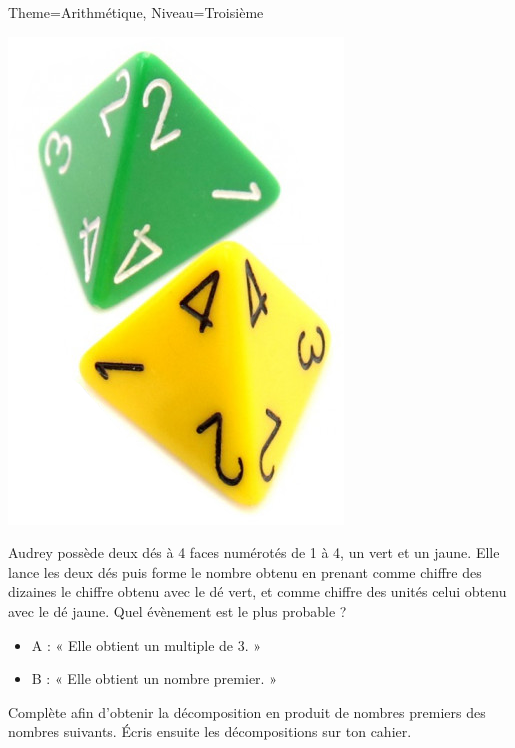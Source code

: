 \documentclass[11pt]{article}
\begin{document}
\begin{multicols}{2}
\begin{Maquette}[Fiche]{Theme=Arithmétique, Niveau=Troisième}
\begin{exercice}
    \begin{center}
        \includegraphics[width=.5\linewidth]{Images/Dés4faces.png}
    \end{center}
    Audrey possède deux dés à 4 faces numérotés de 1 à 4, un vert et un jaune.
    Elle lance les deux dés puis forme le nombre obtenu en prenant comme chiffre des dizaines le chiffre obtenu avec le dé vert, et comme chiffre des unités celui obtenu avec le dé jaune. Quel évènement est le plus probable ?
    \begin{itemize}
        \item A : « Elle obtient un multiple de 3. »
        \item B : « Elle obtient un nombre premier. »
    \end{itemize}
\end{exercice}

\columnbreak

\begin{exercice}
    Complète afin d’obtenir la décomposition en produit de nombres premiers des nombres suivants. Écris ensuite les décompositions sur ton cahier.
    \begin{multicols}{3}
    \end{multicols}
    \begin{multicols}{3}
    \end{multicols}
\end{exercice}


\end{Maquette}
\end{multicols}
\end{document}
